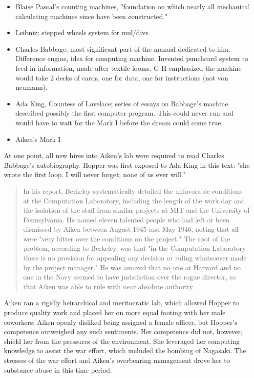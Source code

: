 \begin{itemize}
    \item Blaise Pascal's counting machines, "foundation on which nearly all mechanical calculating machines since have been constructed."
    \item Leibniz; stepped wheels system for mul/divs.
    \item Charles Babbage; most significant part of the manual dedicated to him.
          Difference engine, idea for computing machine. Invented punchcard system to feed in information, made after textile looms.
          G H emphasized the machine would take 2 decks of cards, one for data, one for instructions (not von neumann).
    \item Ada King, Countess of Lovelace; series of essays on Babbage's machine.
          described possibly the first computer program. This could never run and would
          have to wait for the Mark I before the dream could come true.
    \item Aiken's Mark I
\end{itemize}

At one point, all new hires into Aiken's lab were required to read
Charles Babbage's autobiography.
Hopper was first exposed to Ada King in this text:
"she wrote the first loop. I will never forget; none of us ever will."

\begin{quotation}
In his report, Berkeley systematically detailed the unfavorable conditions at 
the Computation Laboratory, including the length of the work day and the 
isolation of the staff from similar projects at MIT and the University of 
Pennsylvania. He named eleven talented people who had left or been dismissed by 
Aiken between August 1945 and May 1946, noting that all were "very bitter over 
the conditions on the project." The root of the problem, according to Berkeley, 
was that "in the Computation Laboratory there is no provision for appealing any 
decision or ruling whatsoever made by the project manager." He was amazed that 
no one at Harvard and no one in the Navy seemed to have jurisdiction over the 
rogue director, so that Aiken was able to rule with near absolute authority.
\end{quotation}

Aiken ran a rigidly heirarchical and meritocratic lab, which allowed Hopper
to produce quality work and placed her on more equal footing with her
male coworkers; Aiken openly disliked being assigned a female officer,
but Hopper's competence outweighed any such sentiments.
Her competence did not, however, shield her from the pressures of the environment.
She leveraged her computing knowledge to assist the war effort,
which included the bombing of Nagasaki.
The stresses of the war effort and Aiken's overbearing management drove her to
substance abuse in this time period.

